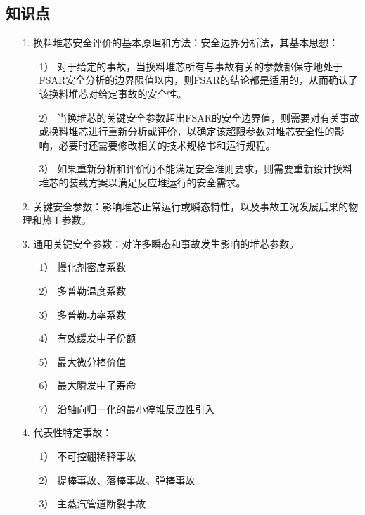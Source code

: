 \documentclass[openany]{ctexart}
\numberwithin{equation}{section} %
\begin{document}
\subsection{知识点}
\begin{itemize}
	\item [1.]换料堆芯安全评价的基本原理和方法：{\heiti 安全边界分析法}，其基本思想：
	\begin{itemize}
		\item [1）]对于给定的事故，当换料堆芯所有与事故有关的参数都保守地处于FSAR安全分析的边界限值以内，则FSAR的结论都是适用的，从而确认了该换料堆芯对给定事故的安全性。
		
		\item [2）]当换堆芯的关键安全参数超出FSAR的安全边界值，则需要对有关事故或换料堆芯进行重新分析或评价，以确定该超限参数对堆芯安全性的影响，必要时还需要修改相关的技术规格书和运行规程。
		
		\item [3）]如果重新分析和评价仍不能满足安全准则要求，则需要重新设计换料堆芯的装载方案以满足反应堆运行的安全需求。
		
	\end{itemize}
	
	\item [2.]关键安全参数：影响堆芯正常运行或瞬态特性，以及事故工况发展后果的物理和热工参数。
	
	\vspace{0.15cm}
	
	\item [3.]通用关键安全参数：对许多瞬态和事故发生影响的堆芯参数。
		\begin{itemize}
		\vspace{-0.1cm}
		\item [1）]慢化剂密度系数
		\vspace{-0.1cm}
		\item [2）]多普勒温度系数
		\vspace{-0.1cm}
		\item [3）]多普勒功率系数
		\vspace{-0.1cm}
		\item [4）]有效缓发中子份额
		\vspace{-0.1cm}
		\item [5）]最大微分棒价值
		\vspace{-0.1cm}
		\item [6）]最大瞬发中子寿命
		\vspace{-0.1cm}
		\item [7）]沿轴向归一化的最小停堆反应性引入
	\end{itemize}
	
	\vspace{0.15cm}
	
	\item [4.]代表性特定事故：
		\begin{itemize}
			\vspace{-0.1cm}
			\item [1）]不可控硼稀释事故
			\vspace{-0.1cm}
			\item [2）]提棒事故、落棒事故、弹棒事故
			\vspace{-0.1cm}
			\item [3）]主蒸汽管道断裂事故
			
		\end{itemize}
\end{itemize}
\end{document}
